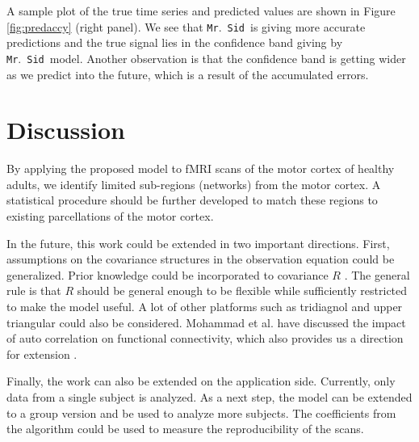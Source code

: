 \documentclass[fleqn,12pt]{article}
\let\oldref\ref
\renewcommand{\ref}[1]{(\oldref{#1})}
\newcommand{\mrsid}{{\sc \texttt{Mr}.~\texttt{Sid}}}
\begin{document}
A sample plot of the true time series and predicted values are shown in Figure \oldref{fig:predaccy} (right panel). We see that \mrsid~is giving more accurate predictions and the true signal lies in the confidence band giving by \mrsid~model. Another observation is that the confidence band is getting wider as we predict into the future, which is a result of the accumulated errors.


\section{Discussion}

By applying the proposed model to fMRI scans of the motor cortex of healthy adults, we identify limited sub-regions (networks) from the motor cortex. A statistical procedure should be further developed to match these regions to existing parcellations of the motor cortex.

In the future, this work could be extended in two important directions. First, assumptions on the covariance structures in the observation equation could be generalized. Prior knowledge could be incorporated to covariance $R$ \citep{allen2014generalized}. The general rule is that $R$ should be general enough to be flexible while sufficiently restricted to make the model useful. A lot of other platforms such as tridiagnol and upper triangular could also be considered. Mohammad et al. have discussed the impact of auto correlation on functional connectivity, which also provides us a direction for extension \citep{arbabshirani2014impact}.

Finally, the work can also be extended on the application side. Currently, only data from a single subject is analyzed. As a next step, the model can be extended to a group version and be used to analyze more subjects. The coefficients from the algorithm could be used to measure the reproducibility of the scans.


%


\end{document}
